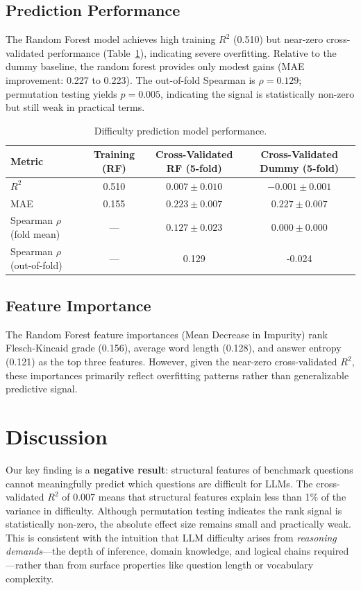 \documentclass[11pt,a4paper]{article}
\begin{document}
\subsection{Prediction Performance}

The Random Forest model achieves high training $R^2$ (0.510) but near-zero cross-validated performance (Table~\ref{tab:model}), indicating severe overfitting. Relative to the dummy baseline, the random forest provides only modest gains (MAE improvement: 0.227 to 0.223). The out-of-fold Spearman is $\rho = 0.129$; permutation testing yields $p = 0.005$, indicating the signal is statistically non-zero but still weak in practical terms.

\begin{table}[h]
\centering
\caption{Difficulty prediction model performance.}
\label{tab:model}
\begin{tabular}{lccc}
\toprule
Metric & Training (RF) & Cross-Validated RF (5-fold) & Cross-Validated Dummy (5-fold) \\
\midrule
$R^2$ & 0.510 & $0.007 \pm 0.010$ & $-0.001 \pm 0.001$ \\
MAE & 0.155 & $0.223 \pm 0.007$ & $0.227 \pm 0.007$ \\
Spearman $\rho$ (fold mean) & --- & $0.127 \pm 0.023$ & $0.000 \pm 0.000$ \\
Spearman $\rho$ (out-of-fold) & --- & 0.129 & -0.024 \\
\bottomrule
\end{tabular}
\end{table}

\subsection{Feature Importance}

The Random Forest feature importances (Mean Decrease in Impurity) rank Flesch-Kincaid grade (0.156), average word length (0.128), and answer entropy (0.121) as the top three features. However, given the near-zero cross-validated $R^2$, these importances primarily reflect overfitting patterns rather than generalizable predictive signal.

\section{Discussion}

Our key finding is a \textbf{negative result}: structural features of benchmark questions cannot meaningfully predict which questions are difficult for LLMs. The cross-validated $R^2$ of 0.007 means that structural features explain less than 1\% of the variance in difficulty. Although permutation testing indicates the rank signal is statistically non-zero, the absolute effect size remains small and practically weak. This is consistent with the intuition that LLM difficulty arises from \emph{reasoning demands}---the depth of inference, domain knowledge, and logical chains required---rather than from surface properties like question length or vocabulary complexity.
\end{document}
